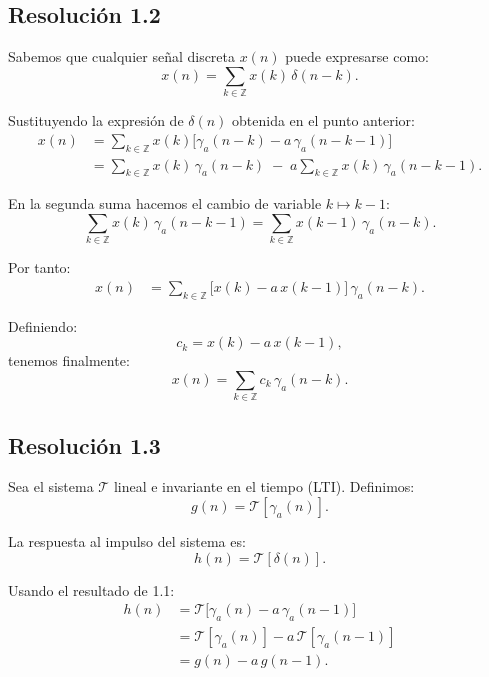 \documentclass[
  11pt,
  letterpaper,
   addpoints,
   answers
  ]{exam}
\begin{document}
\begin{questions}
\begin{solution}
\subsection*{Resolución 1.2}
Sabemos que cualquier señal discreta \(x(n)\) puede expresarse como:
\begin{equation}
x(n) = \sum_{k \in \mathbb{Z}} x(k)\,\delta(n-k).
\end{equation}

Sustituyendo la expresión de \(\delta(n)\) obtenida en el punto anterior:
\begin{align}
x(n) &= \sum_{k \in \mathbb{Z}} x(k)\Big[ \gamma_a(n-k) - a\,\gamma_a(n-k-1)\Big] \\
&= \sum_{k \in \mathbb{Z}} x(k)\,\gamma_a(n-k) \;-\; a \sum_{k \in \mathbb{Z}} x(k)\,\gamma_a(n-k-1).
\end{align}

En la segunda suma hacemos el cambio de variable \(k \mapsto k-1\):
\begin{equation}
\sum_{k \in \mathbb{Z}} x(k)\,\gamma_a(n-k-1) 
= \sum_{k \in \mathbb{Z}} x(k-1)\,\gamma_a(n-k).
\end{equation}

Por tanto:
\begin{align}
x(n) &= \sum_{k \in \mathbb{Z}} \Big[x(k) - a\,x(k-1)\Big] \,\gamma_a(n-k).
\end{align}

Definiendo:
\begin{equation}
c_k = x(k) - a\,x(k-1),
\end{equation}
tenemos finalmente:
\begin{equation}
x(n) = \sum_{k \in \mathbb{Z}} c_k\,\gamma_a(n-k).
\end{equation}

\subsection*{Resolución 1.3}
Sea el sistema \( \mathcal{T} \) lineal e invariante en el tiempo (LTI). Definimos:
\begin{equation}
g(n) = \mathcal{T}[\gamma_a(n)].
\end{equation}

La respuesta al impulso del sistema es:
\begin{equation}
h(n) = \mathcal{T}[\delta(n)].
\end{equation}

Usando el resultado de 1.1:
\begin{align}
h(n) &= \mathcal{T}\big[\gamma_a(n) - a\,\gamma_a(n-1)\big] \\
&= \mathcal{T}[\gamma_a(n)] - a\,\mathcal{T}[\gamma_a(n-1)] \\
&= g(n) - a\,g(n-1).
\end{align}


\end{solution}
\end{questions}
\end{document}
